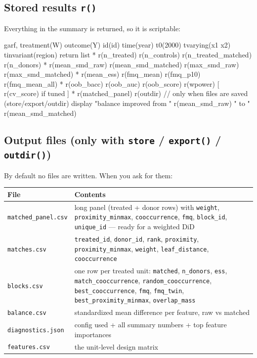 \documentclass[11pt,a4paper]{article}
\newcommand{\code}[1]{\texttt{#1}}
\begin{document}
\subsection{Stored results \texttt{r()}}
Everything in the summary is returned, so it is scriptable:
\begin{stata}
garf, treatment(W) outcome(Y) id(id) time(year) t0(2000) tvarying(x1 x2) tinvariant(region)
return list
* r(n_treated) r(n_controls) r(n_treated_matched) r(n_donors)
* r(mean_smd_raw) r(mean_smd_matched) r(max_smd_raw) r(max_smd_matched)
* r(mean_ess) r(fmq_mean) r(fmq_p10) r(fmq_mean_all)
* r(oob_bacc) r(oob_auc) r(oob_score) r(wpower)  [ r(cv_score) if tuned ]
* r(matched_panel)  r(outdir)   // only when files are saved (store/export/outdir)
display "balance improved from " r(mean_smd_raw) " to " r(mean_smd_matched)
\end{stata}

\subsection{Output files (only with \texttt{store} / \texttt{export()} / \texttt{outdir()})}
By default no files are written. When you ask for them:

\begin{tabularx}{\textwidth}{@{}lX@{}}
\toprule
File & Contents\\
\midrule
\code{matched\_panel.csv} & long panel (treated + donor rows) with \code{weight}, \code{proximity\_minmax}, \code{cooccurrence}, \code{fmq}, \code{block\_id}, \code{unique\_id} --- ready for a weighted DiD\\
\code{matches.csv}        & \code{treated\_id}, \code{donor\_id}, \code{rank}, \code{proximity}, \code{proximity\_minmax}, \code{weight}, \code{leaf\_distance}, \code{cooccurrence}\\
\code{blocks.csv}         & one row per treated unit: \code{matched}, \code{n\_donors}, \code{ess}, \code{match\_cooccurrence}, \code{random\_cooccurrence}, \code{best\_cooccurrence}, \code{fmq}, \code{fmq\_twin}, \code{best\_proximity\_minmax}, \code{overlap\_mass}\\
\code{balance.csv}        & standardized mean difference per feature, raw vs matched\\
\code{diagnostics.json}   & config used + all summary numbers + top feature importances\\
\code{features.csv}       & the unit-level design matrix\\
\bottomrule
\end{tabularx}
\end{document}
